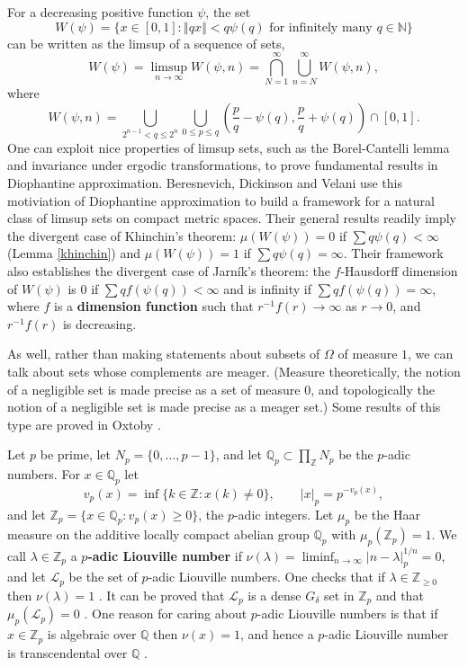 \documentclass{article}
\newcommand{\norm}[1]{\left\Vert #1 \right\Vert}
\begin{document}
For a decreasing positive function $\psi$, the set
\[
W(\psi) = \{ x \in [0,1] : \textrm{$\norm{qx} < q \psi(q)$ for infinitely many  $q \in \mathbb{N}$} \}
\]
can be written as the limsup of a sequence of sets, 
\[
W(\psi) = \limsup_{n \to \infty} W(\psi, n) = \bigcap_{N=1}^\infty \bigcup_{n=N}^\infty W(\psi,n),
\]
where 
\[
W(\psi, n) = \bigcup_{2^{n-1} < q \leq 2^n} \bigcup_{0\leq p \leq q} \left( \frac{p}{q} - \psi(q), \frac{p}{q} + \psi(q) \right) \cap [0,1].
\]
One can exploit nice properties of limsup sets, such as the Borel-Cantelli lemma and invariance under ergodic transformations, to prove fundamental results in Diophantine approximation.  Beresnevich, Dickinson and Velani \cite{limsup} use this motiviation of Diophantine approximation to build a framework for a natural class of limsup sets on compact metric spaces.  Their general results readily imply the divergent  case of  Khinchin's theorem: $\mu(W(\psi)) = 0$ if $\sum q \psi(q) < \infty$  (Lemma \ref{khinchin}) and 
$\mu(W(\psi)) = 1$ if $\sum q \psi(q) = \infty$.  Their framework also establishes the divergent case of Jarn\'ik's  theorem: the $f$-Hausdorff dimension of $W(\psi)$ is $0$ if $\sum q f(\psi(q)) < \infty$ and is infinity if $\sum q f(\psi(q)) = \infty$, where $f$ is a
\textbf{dimension function} such that $r^{-1} f(r) \to \infty$ as $r \to 0$, and $r^{-1} f(r)$ is decreasing.  


As well, rather than making statements about subsets of $\Omega$ of measure $1$, we can talk about sets whose complements are meager. (Measure theoretically,
the notion of a negligible set is made precise as a set of measure $0$, and topologically the notion of a negligible set is made precise as a meager set.)
Some results of this type are proved in Oxtoby \cite[Chapter 2]{oxtoby}.

Let $p$ be prime, let $N_p=\{0,\ldots,p-1\}$, and let $\mathbb{Q}_p \subset \prod_{\mathbb{Z}} N_p$ be the $p$-adic numbers. For $x \in \mathbb{Q}_p$
let
\[
v_p(x) = \inf\{k \in \mathbb{Z}: x(k) \neq 0\},\qquad |x|_p = p^{-v_p(x)},
\]
and let $\mathbb{Z}_p = \{x \in \mathbb{Q}_p: v_p(x) \geq 0\}$, the $p$-adic integers. 
Let $\mu_p$ be the Haar measure on the additive locally compact abelian group $\mathbb{Q}_p$ with
$\mu_p(\mathbb{Z}_p)=1$. 
We call $\lambda \in \mathbb{Z}_p$ a \textbf{$p$-adic Liouville number} if $\nu(\lambda)=\liminf_{n \to \infty} |n-\lambda|_p^{1/n}=0$, and let
$\mathscr{L}_p$ be the set of $p$-adic Liouville numbers. One checks that if $\lambda \in \mathbb{Z}_{\geq 0}$ then
$\nu(\lambda)=1$  \cite[p.~201, Exercise 66.A]{schikhof}.
It can be proved that $\mathscr{L}_p$ is a dense $G_\delta$ set in $\mathbb{Z}_p$ \cite[p.~204,
Theorem 67.3]{schikhof} and that
$\mu_p(\mathscr{L}_p)=0$ \cite[p.~205, Theorem 67.4]{schikhof}.
One reason for caring about $p$-adic Liouville numbers is that
if $x \in \mathbb{Z}_p$ is algebraic over $\mathbb{Q}$ then $\nu(x)=1$, and hence
a $p$-adic Liouville number is transcendental over $\mathbb{Q}$ \cite[p.~203, Theorem 67.2]{schikhof}.
\end{document}
